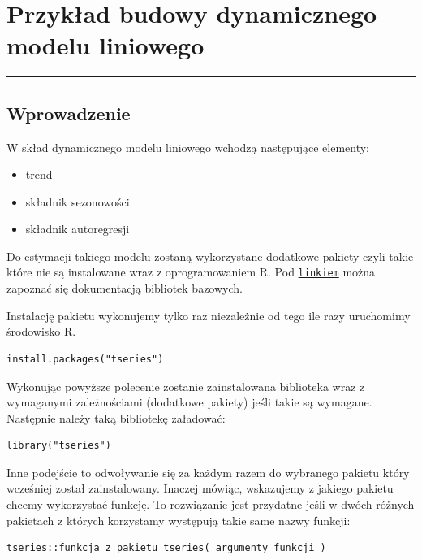 \documentclass[polish,]{book}
\begin{document}
\hypertarget{part_10}{%
\chapter{Przykład budowy dynamicznego modelu liniowego}\label{part_10}}

\begin{center}\rule{0.5\linewidth}{\linethickness}\end{center}

\hypertarget{part_10.1}{%
\section{Wprowadzenie}\label{part_10.1}}

W skład dynamicznego modelu liniowego wchodzą następujące elementy:

\begin{itemize}
\item
  trend
\item
  składnik sezonowości
\item
  składnik autoregresji
\end{itemize}

Do estymacji takiego modelu zostaną wykorzystane dodatkowe pakiety czyli takie
które nie są instalowane wraz z oprogramowaniem R. Pod \href{https://rdrr.io/r/}{\texttt{linkiem}} można zapoznać się dokumentacją bibliotek bazowych.

Instalację pakietu wykonujemy tylko raz niezależnie od tego ile razy uruchomimy
środowisko R.

\begin{verbatim}
install.packages("tseries")
\end{verbatim}

Wykonując powyższe polecenie zostanie zainstalowana biblioteka wraz z wymaganymi zależnościami (dodatkowe pakiety) jeśli takie są wymagane. Następnie
należy taką bibliotekę załadować:

\begin{verbatim}
library("tseries")
\end{verbatim}

Inne podejście to odwoływanie się za każdym razem do wybranego pakietu który wcześniej został zainstalowany. Inaczej mówiąc, wskazujemy z jakiego pakietu chcemy wykorzystać funkcję. To rozwiązanie jest przydatne jeśli w dwóch różnych pakietach z których korzystamy występują takie same nazwy funkcji:

\begin{verbatim}
tseries::funkcja_z_pakietu_tseries( argumenty_funkcji )
\end{verbatim}
\end{document}
